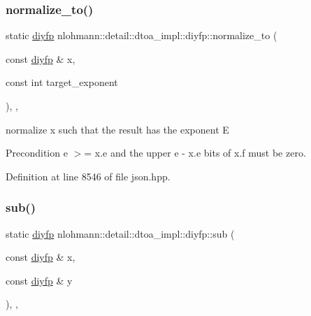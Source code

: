 \subsubsection{\texorpdfstring{normalize\+\_\+to()}{normalize\_to()}}
{\footnotesize\ttfamily static \hyperlink{structnlohmann_1_1detail_1_1dtoa__impl_1_1diyfp}{diyfp} nlohmann\+::detail\+::dtoa\+\_\+impl\+::diyfp\+::normalize\+\_\+to (\begin{DoxyParamCaption}\item[{const \hyperlink{structnlohmann_1_1detail_1_1dtoa__impl_1_1diyfp}{diyfp} \&}]{x,  }\item[{const int}]{target\+\_\+exponent }\end{DoxyParamCaption})\hspace{0.3cm}{\ttfamily [inline]}, {\ttfamily [static]}, {\ttfamily [noexcept]}}



normalize x such that the result has the exponent E 

\begin{DoxyPrecond}{Precondition}
e $>$= x.\+e and the upper e -\/ x.\+e bits of x.\+f must be zero. 
\end{DoxyPrecond}


Definition at line 8546 of file json.\+hpp.

\mbox{\label{structnlohmann_1_1detail_1_1dtoa__impl_1_1diyfp_aeb26771af54ad73598c1a0430d65d884}} 
\subsubsection{\texorpdfstring{sub()}{sub()}}
{\footnotesize\ttfamily static \hyperlink{structnlohmann_1_1detail_1_1dtoa__impl_1_1diyfp}{diyfp} nlohmann\+::detail\+::dtoa\+\_\+impl\+::diyfp\+::sub (\begin{DoxyParamCaption}\item[{const \hyperlink{structnlohmann_1_1detail_1_1dtoa__impl_1_1diyfp}{diyfp} \&}]{x,  }\item[{const \hyperlink{structnlohmann_1_1detail_1_1dtoa__impl_1_1diyfp}{diyfp} \&}]{y }\end{DoxyParamCaption})\hspace{0.3cm}{\ttfamily [inline]}, {\ttfamily [static]}, {\ttfamily [noexcept]}}



